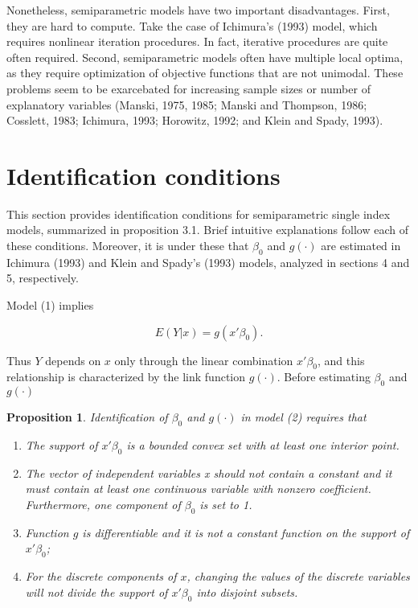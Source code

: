 \documentclass[a4paper]{article}
\begin{document}
Nonetheless, semiparametric models have two important disadvantages. First, they are hard to compute. Take the case of Ichimura's (1993) model, which requires nonlinear iteration procedures. In fact, iterative procedures are quite often required. Second, semiparametric models often have multiple local optima, as they require optimization of objective functions that are not unimodal. These problems seem to be exarcebated for increasing sample sizes or number of explanatory variables (Manski, 1975, 1985; Manski and Thompson, 1986; Cosslett, 1983; Ichimura, 1993; Horowitz, 1992; and Klein and Spady, 1993).


\section{Identification conditions} %
\label{sec:Identification conditions}

This section provides identification conditions for semiparametric single index models,  summarized in proposition 3.1. Brief intuitive explanations follow each of these conditions. Moreover, it is under these that $\beta_0$ and $ g(\cdot)$ are estimated in Ichimura (1993) and Klein and Spady's (1993) models, analyzed in sections 4 and 5, respectively.


Model (1) implies

\begin{equation}
E(Y|x) = g(x'\beta_0).
\end{equation}

Thus $Y$ depends on $x$ only through the linear combination $x'\beta_0$, and this relationship is characterized by the link function $g(\cdot)$. Before estimating  $\beta_0$ and $ g(\cdot)$


\newtheorem{prop}{Proposition}[section]

\begin{prop}
Identification of $\beta_0$ and $g(\cdot)$ in model (2) requires that
\begin{enumerate}[label=(\roman*)]
\item The support of $x'\beta_0$ is a bounded convex set with at least one interior point. 
\item The vector of independent variables x should not contain a constant and it must contain at least one continuous variable with nonzero coefficient. Furthermore, one component of $\beta_0$ is set to 1. 
\item Function $g$ is differentiable and it is not a constant function on the support of $x'\beta_0$;
\item For the discrete components of $x$, changing the values of the discrete variables will not divide the support of $x'\beta_0$ into disjoint subsets.
\end{enumerate}
\end{prop}
\end{document}
